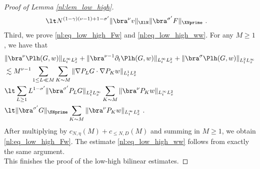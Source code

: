 \documentclass[11pt]{article}
\begin{document}
\begin{proof}[Proof of Lemma \ref{nl:lem_low_high}]
\begin{align*}
&\lt N^{(1-\gamma)(\nu-1)+1-\sigma^\prime}\| \bra^\nu v \|_{\XlN} \| \bra^{\sigma^\prime} F \|_{\XNprime}~.
\end{align*}
Third, we prove \eqref{nl:eq_low_high_Fw} and \eqref{nl:eq_low_high_ww}. For any \( M \geq 1 \), we have that 
\begin{align*}
&\| \bra^\nu  \Plh(G,w) \|_{L_t^\infty L_x^2} +\| \bra^{\nu-1} \partial_t  \Plh(G,w) \|_{L_t^\infty L_x^2}+ \| \bra^\sigma \Plh(G,w) \|_{L_t^2 L_x^\infty} \\
&\lesssim M^{\nu-1} \sum_{1\leq L \ll M} \sum_{K\sim M} \| \nabla P_L G \cdot \nabla  P_K w \|_{L_t^1L_x^2}\\
&\lt  \sum_{L\geq 1} L^{1-\sigma^\prime} \| \bra^{\sigma^\prime} P_L G \|_{L_t^2 L_x^\infty} \sum_{K\sim M} \| \bra^\nu P_K w \|_{L_t^\infty L_x^2} \\
&\lt \| \bra^{\sigma^\prime} G \|_{\SNprime}  \sum_{K\sim M} \| \bra^\nu P_K w \|_{L_t^\infty L_x^2} ~. 
\end{align*}
After multiplying by \( c_{N,\eta}(M)+c_{\leq N,D}(M) \) and summing in \( M \geq 1 \), we obtain \eqref{nl:eq_low_high_Fw}. The estimate \eqref{nl:eq_low_high_ww} follows from exactly the same argument. \\
This finishes the proof of the low-high bilinear estimates.

\end{proof}
\end{document}

